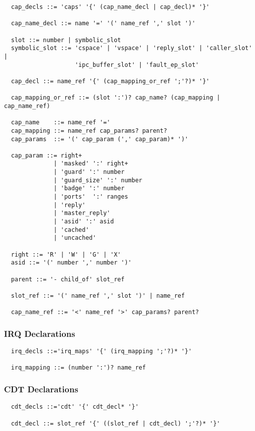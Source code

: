 \documentclass[a4paper,11pt]{article}
\begin{document}
\begin{verbatim}
  cap_decls ::= 'caps' '{' (cap_name_decl | cap_decl)* '}'

  cap_name_decl ::= name '=' '(' name_ref ',' slot ')'

  slot ::= number | symbolic_slot
  symbolic_slot ::= 'cspace' | 'vspace' | 'reply_slot' | 'caller_slot' |
                    'ipc_buffer_slot' | 'fault_ep_slot'

  cap_decl ::= name_ref '{' (cap_mapping_or_ref ';'?)* '}'

  cap_mapping_or_ref ::= (slot ':')? cap_name? (cap_mapping | cap_name_ref)

  cap_name    ::= name_ref '='
  cap_mapping ::= name_ref cap_params? parent?
  cap_params  ::= '(' cap_param (',' cap_param)* ')' 

  cap_param ::= right+
              | 'masked' ':' right+
              | 'guard' ':' number
              | 'guard_size' ':' number
              | 'badge' ':' number
              | 'ports'  ':' ranges
              | 'reply'
              | 'master_reply'
              | 'asid' ':' asid
              | 'cached'
              | 'uncached'

  right ::= 'R' | 'W' | 'G' | 'X'
  asid ::= '(' number ',' number ')'

  parent ::= '- child_of' slot_ref

  slot_ref ::= '(' name_ref ',' slot ')' | name_ref

  cap_name_ref ::= '<' name_ref '>' cap_params? parent?
\end{verbatim}


\subsubsection{IRQ Declarations}

\begin{verbatim}
  irq_decls ::='irq_maps' '{' (irq_mapping ';'?)* '}'

  irq_mapping ::= (number ':')? name_ref
\end{verbatim}


\subsubsection{CDT Declarations}

\begin{verbatim}
  cdt_decls ::='cdt' '{' cdt_decl* '}'

  cdt_decl ::= slot_ref '{' ((slot_ref | cdt_decl) ';'?)* '}'
\end{verbatim}
\end{document}
